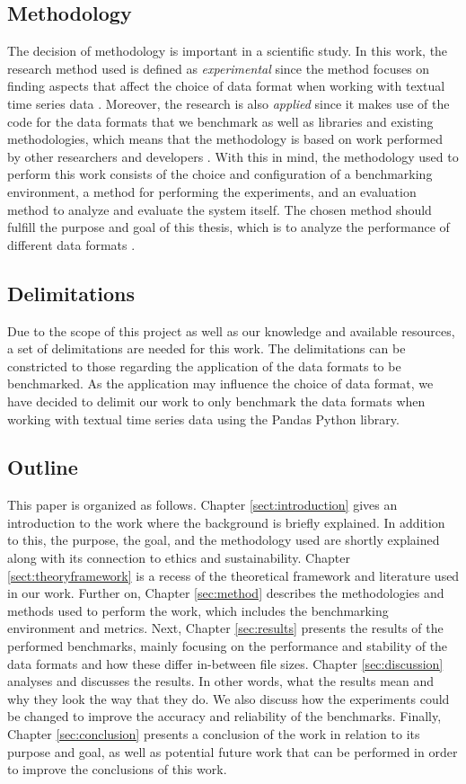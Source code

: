 \subsection{Methodology}
\label{sect:intromethod}
The decision of methodology is important in a scientific study. In this work, the research method used is defined as \textit{experimental} since the method focuses on finding aspects that affect the choice of data format when working with textual time series data \cite{hakansson_portal_2013}. Moreover, the research is also \textit{applied} since it makes use of the code for the data formats that we benchmark as well as libraries and existing methodologies, which means that the methodology is based on work performed by other researchers and developers \cite{hakansson_portal_2013, blomer_quantitative_2018}. With this in mind, the methodology used to perform this work consists of the choice and configuration of a benchmarking environment, a method for performing the experiments, and an evaluation method to analyze and evaluate the system itself. The chosen method should fulfill the purpose and goal of this thesis, which is to analyze the performance of different data formats \cite{hakansson_portal_2013}.

\subsection{Delimitations}
\label{sect:delimit}
Due to the scope of this project as well as our knowledge and available resources, a set of delimitations are needed for this work. The delimitations can be constricted to those regarding the application of the data formats to be benchmarked. As the application may influence the choice of data format, we have decided to delimit our work to only benchmark the data formats when working with textual time series data using the Pandas Python library. 

\subsection{Outline}
\label{sect:outline}
This paper is organized as follows. Chapter \ref{sect:introduction} gives an introduction to the work where the background is briefly explained. In addition to this, the purpose, the goal, and the methodology used are shortly explained along with its connection to ethics and sustainability. Chapter \ref{sect:theoryframework} is a recess of the theoretical framework and literature used in our work. Further on, Chapter \ref{sec:method} describes the methodologies and methods used to perform the work, which includes the benchmarking environment and metrics. Next, Chapter \ref{sec:results} presents the results of the performed benchmarks, mainly focusing on the performance and stability of the data formats and how these differ in-between file sizes. Chapter \ref{sec:discussion} analyses and discusses the results. In other words, what the results mean and why they look the way that they do. We also discuss how the experiments could be changed to improve the accuracy and reliability of the benchmarks. Finally, Chapter \ref{sec:conclusion} presents a conclusion of the work in relation to its purpose and goal, as well as potential future work that can be performed in order to improve the conclusions of this work.
